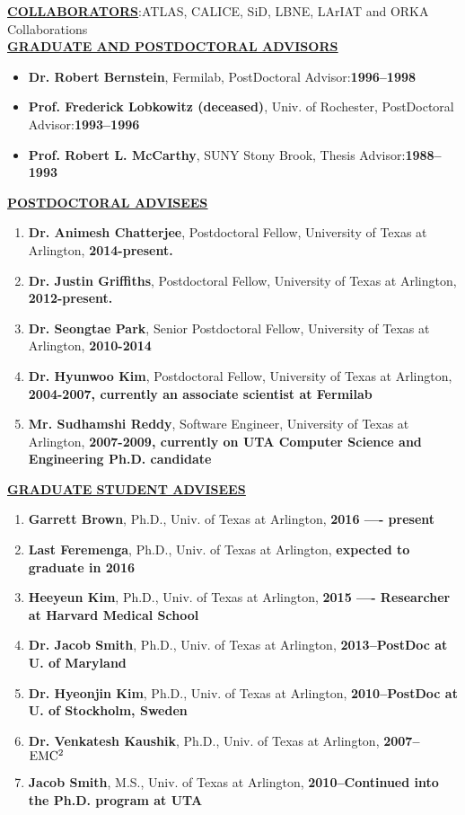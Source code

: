 %
{\underline{\underline{{\bf COLLABORATORS}}}}{:ATLAS, CALICE, SiD, LBNE, LArIAT and ORKA Collaborations}\\
%
{\underline{\underline{{\bf GRADUATE AND POSTDOCTORAL ADVISORS}}}}
\begin{itemize}[noitemsep]
\item {\bf Dr. Robert Bernstein}, Fermilab, PostDoctoral Advisor:{\bf 1996--1998}
\item {\bf Prof. Frederick Lobkowitz (deceased)}, Univ. of Rochester, PostDoctoral Advisor:{\bf 1993--1996}
\item {\bf Prof. Robert L. McCarthy}, SUNY Stony Brook, Thesis Advisor:{\bf 1988--1993}
\end{itemize}
%
{\underline{\underline{{\bf POSTDOCTORAL ADVISEES}}}}
\begin{enumerate}[noitemsep]
\item {\bf Dr. Animesh Chatterjee}, Postdoctoral Fellow, University of Texas at Arlington, {\bf 2014-present.}
\item {\bf Dr. Justin Griffiths}, Postdoctoral Fellow, University of Texas at Arlington, {\bf 2012-present.}
\item {\bf Dr. Seongtae Park}, Senior Postdoctoral Fellow, University of Texas at Arlington, 
{\bf 2010-2014}
\item {\bf Dr. Hyunwoo Kim}, Postdoctoral Fellow, University of Texas at Arlington, {\bf 2004-2007, 
currently an associate scientist at Fermilab}
\item {\bf Mr. Sudhamshi Reddy}, Software Engineer, University of Texas at Arlington, 
{\bf 2007-2009, currently on UTA Computer Science and Engineering Ph.D. candidate}
\end{enumerate}
%
{\underline{\underline{{\bf GRADUATE STUDENT ADVISEES}}}}
\begin{enumerate}[noitemsep]
\item {\bf Garrett Brown}, Ph.D., Univ. of Texas at Arlington, {\bf 2016 —- present}
\item {\bf Last Feremenga}, Ph.D., Univ. of Texas at Arlington, {\bf expected to graduate in 2016}
\item {\bf Heeyeun Kim}, Ph.D., Univ. of Texas at Arlington, {\bf 2015 —- Researcher at Harvard Medical School}
\item {\bf Dr. Jacob Smith}, Ph.D., Univ. of Texas at Arlington, {\bf 2013--PostDoc at U. of Maryland}
\item {\bf Dr. Hyeonjin Kim}, Ph.D., Univ. of Texas at Arlington, {\bf 2010--PostDoc at U. of 
Stockholm, Sweden}
\item {\bf Dr. Venkatesh Kaushik}, Ph.D., Univ. of Texas at Arlington, {\bf 2007-- ${\rm EMC^{2}}$}
\item {\bf Jacob Smith}, M.S., Univ. of Texas at Arlington, {\bf 2010--Continued into 
the Ph.D. program at UTA}
\end{enumerate}
